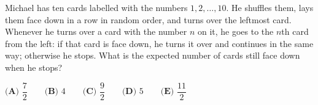Michael has ten cards labelled with the numbers $1,2,\dots,10$. He shuffles them, lays them face down in a row in random order, and turns over the leftmost card. Whenever he turns over a card with the number $n$ on it, he goes to the $n$th card from the left: if that card is face down, he turns it over and continues in the same way; otherwise he stops. What is the expected number of cards still face down when he stops?

$\textbf{(A) } \dfrac{7}{2} \qquad \textbf{(B) } 4 \qquad \textbf{(C) } \dfrac{9}{2} \qquad \textbf{(D) } 5 \qquad \textbf{(E) } \dfrac{11}{2}$
